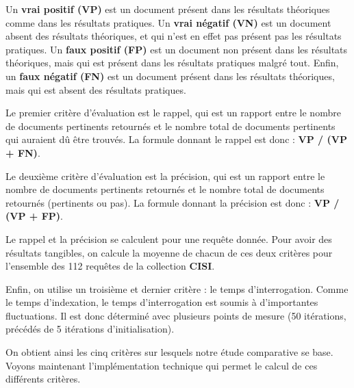 Un \textbf{vrai positif (VP)} est un document présent dans les résultats théoriques comme dans les résultats pratiques. Un \textbf{vrai négatif (VN)} est un document absent des résultats théoriques, et qui n'est en effet pas présent pas les résultats pratiques. Un \textbf{faux positif (FP)} est un document non présent dans les résultats théoriques, mais qui est présent dans les résultats pratiques malgré tout. Enfin, un \textbf{faux négatif (FN)} est un document présent dans les résultats théoriques, mais qui est absent des résultats pratiques.

Le premier critère d'évaluation est le rappel, qui est un rapport entre le nombre de documents pertinents retournés et le nombre total de documents pertinents qui auraient dû être trouvés. La formule donnant le rappel est donc : \textbf{VP / (VP + FN)}. 

Le deuxième critère d'évaluation est la précision, qui est un rapport entre le nombre de documents pertinents retournés et le nombre total de documents retournés (pertinents ou pas). La formule donnant la précision est donc : \textbf{VP / (VP + FP)}.

Le rappel et la précision se calculent pour une requête donnée. Pour avoir des résultats tangibles, on calcule la moyenne de chacun de ces deux critères pour l’ensemble des 112 requêtes de la collection \textbf{CISI}.

Enfin, on utilise un troisième et dernier critère : le temps d’interrogation. Comme le temps d’indexation, le temps d’interrogation est soumis à d’importantes fluctuations. Il est donc déterminé avec plusieurs points de mesure (50 itérations, précédés de 5 itérations d'initialisation).

On obtient ainsi les cinq critères sur lesquels notre étude comparative se base. Voyons maintenant l’implémentation technique qui permet le calcul de ces différents critères.